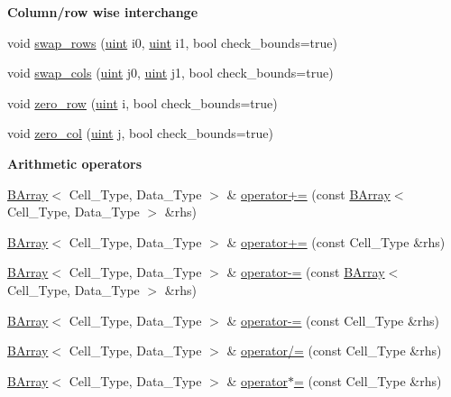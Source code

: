\begin{Indent}\textbf{ Column/row wise interchange}\par
\begin{DoxyCompactItemize}
\item 
void \hyperlink{class_b_array_a742773803481c18e2865b2b2a1e68949}{swap\+\_\+rows} (\hyperlink{typedefs_8hpp_a91ad9478d81a7aaf2593e8d9c3d06a14}{uint} i0, \hyperlink{typedefs_8hpp_a91ad9478d81a7aaf2593e8d9c3d06a14}{uint} i1, bool check\+\_\+bounds=true)
\item 
void \hyperlink{class_b_array_ae94f7e61ca5985244968d9daf2859229}{swap\+\_\+cols} (\hyperlink{typedefs_8hpp_a91ad9478d81a7aaf2593e8d9c3d06a14}{uint} j0, \hyperlink{typedefs_8hpp_a91ad9478d81a7aaf2593e8d9c3d06a14}{uint} j1, bool check\+\_\+bounds=true)
\item 
void \hyperlink{class_b_array_a411085fcb7530669c72d9847340f1bac}{zero\+\_\+row} (\hyperlink{typedefs_8hpp_a91ad9478d81a7aaf2593e8d9c3d06a14}{uint} i, bool check\+\_\+bounds=true)
\item 
void \hyperlink{class_b_array_a0fa473027d00ec53ed08eaea03ac3ef7}{zero\+\_\+col} (\hyperlink{typedefs_8hpp_a91ad9478d81a7aaf2593e8d9c3d06a14}{uint} j, bool check\+\_\+bounds=true)
\end{DoxyCompactItemize}
\end{Indent}
\begin{Indent}\textbf{ Arithmetic operators}\par
\begin{DoxyCompactItemize}
\item 
\hyperlink{class_b_array}{B\+Array}$<$ Cell\+\_\+\+Type, Data\+\_\+\+Type $>$ \& \hyperlink{class_b_array_a503eb705e9a3996046ee4ca339d611de}{operator+=} (const \hyperlink{class_b_array}{B\+Array}$<$ Cell\+\_\+\+Type, Data\+\_\+\+Type $>$ \&rhs)
\item 
\hyperlink{class_b_array}{B\+Array}$<$ Cell\+\_\+\+Type, Data\+\_\+\+Type $>$ \& \hyperlink{class_b_array_a522368274c3283661dc7a02c50cc09cf}{operator+=} (const Cell\+\_\+\+Type \&rhs)
\item 
\hyperlink{class_b_array}{B\+Array}$<$ Cell\+\_\+\+Type, Data\+\_\+\+Type $>$ \& \hyperlink{class_b_array_a2583fb2b69c1f79ea420b88e981deafa}{operator-\/=} (const \hyperlink{class_b_array}{B\+Array}$<$ Cell\+\_\+\+Type, Data\+\_\+\+Type $>$ \&rhs)
\item 
\hyperlink{class_b_array}{B\+Array}$<$ Cell\+\_\+\+Type, Data\+\_\+\+Type $>$ \& \hyperlink{class_b_array_ae43e3345fccd4d1ef05fb4d063f07b7b}{operator-\/=} (const Cell\+\_\+\+Type \&rhs)
\item 
\hyperlink{class_b_array}{B\+Array}$<$ Cell\+\_\+\+Type, Data\+\_\+\+Type $>$ \& \hyperlink{class_b_array_a39dab15e2d3c22ac7bb80aba51faf743}{operator/=} (const Cell\+\_\+\+Type \&rhs)
\item 
\hyperlink{class_b_array}{B\+Array}$<$ Cell\+\_\+\+Type, Data\+\_\+\+Type $>$ \& \hyperlink{class_b_array_a614ae954b9094ff4934f0d81002f8ddb}{operator$\ast$=} (const Cell\+\_\+\+Type \&rhs)
\end{DoxyCompactItemize}
\end{Indent}
